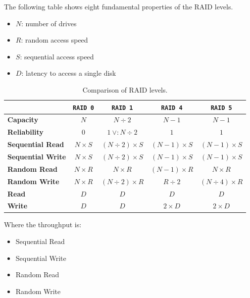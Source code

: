 \noindent
The following table shows eight fundamental properties of the RAID levels.
\begin{itemize}
    \item $N$: number of drives
    \item $R$: random access speed
    \item $S$: sequential access speed
    \item $D$: latency to access a single disk
\end{itemize}
\begin{table}[!htp]
    \centering
    \begin{tabular}{@{} l | c | c | c | c @{}}
        \toprule
        & \texttt{RAID 0} & \texttt{RAID 1} & \texttt{RAID 4} & \texttt{RAID 5} \\
        \midrule
        \textbf{Capacity} & $N$ & $N \div 2$ & $N - 1$ & $N - 1$ \\
        \textbf{Reliability} & $0$ & $1 \: \lor : N \div 2$ & $1$ & $1$ \\
        \cmidrule{1-5}
        \textbf{Sequential Read} & $N \times S$ & $\left(N \div 2\right) \times S$ & $\left(N - 1\right) \times S$ & $\left(N - 1\right) \times S$ \\
        \textbf{Sequential Write} & $N \times S$ & $\left(N \div 2\right) \times S$ & $\left(N - 1\right) \times S$ & $\left(N - 1\right) \times S$ \\
        \textbf{Random Read} & $N \times R$ & $N \times R$ & $\left(N - 1\right) \times R$ & $N \times R$ \\
        \textbf{Random Write} & $N \times R$ & $\left(N \div 2\right) \times R$ & $R \div 2$ & $\left(N \div 4\right) \times R$ \\
        \cmidrule{1-5}
        \textbf{Read} & $D$ & $D$ & $D$ & $D$ \\
        \textbf{Write} & $D$ & $D$ & $2 \times D$ & $2 \times D$ \\
        \bottomrule
    \end{tabular}
    \caption{Comparison of RAID levels.}
\end{table}

\noindent
Where the throughput is:
\begin{multicols}{2}
    \begin{itemize}
        \item Sequential Read
        \item Sequential Write
        \item Random Read
        \item Random Write
    \end{itemize}
\end{multicols}

